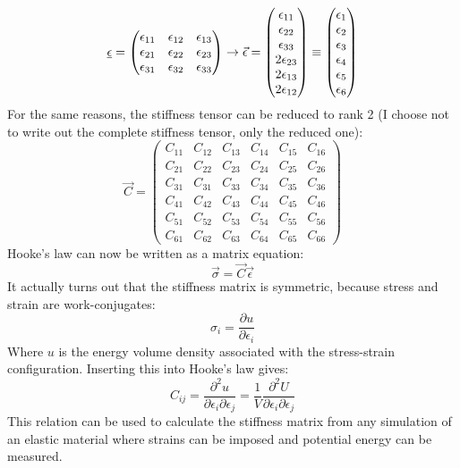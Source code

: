 \begin{equation}
	\uline{\epsilon} = 
	\begin{pmatrix}
	\epsilon_{11} & \epsilon_{12} & \epsilon_{13} \\
	\epsilon_{21} & \epsilon_{22} & \epsilon_{23} \\
	\epsilon_{31} & \epsilon_{32} & \epsilon_{33} \\ 
	\end{pmatrix}
	\to 
	\vec{\epsilon} = 
	\begin{pmatrix}
	\epsilon_{11} \\ \epsilon_{22} \\ \epsilon_{33} \\ 2\epsilon_{23} \\ 2\epsilon_{13} \\ 2\epsilon_{12}
	\end{pmatrix}
	\equiv
	\begin{pmatrix}
	\epsilon_{1} \\ \epsilon_{2} \\ \epsilon_{3} \\ \epsilon_{4} \\ \epsilon_{5} \\ \epsilon_{6}
	\end{pmatrix}
	\label{eq:epsilon_def}
\end{equation}
For the same reasons, the stiffness tensor can be reduced to rank 2 (I choose not to write out the complete stiffness tensor, only the reduced one):
\begin{equation}
	\vec{C} =
	\begin{pmatrix}
	C_{11} & C_{12} & C_{13} & C_{14} & C_{15} & C_{16} \\
	C_{21} & C_{22} & C_{23} & C_{24} & C_{25} & C_{26} \\
	C_{31} & C_{31} & C_{33} & C_{34} & C_{35} & C_{36} \\
	C_{41} & C_{42} & C_{43} & C_{44} & C_{45} & C_{46} \\
	C_{51} & C_{52} & C_{53} & C_{54} & C_{55} & C_{56} \\
	C_{61} & C_{62} & C_{63} & C_{64} & C_{65} & C_{66}
	\end{pmatrix}
\end{equation}
Hooke's law can now be written as a matrix equation:
\begin{equation}
	\vec{\sigma} = \vec{C}\vec{\epsilon}
\end{equation}
It actually turns out that the stiffness matrix is symmetric, because stress and strain are work-conjugates:
\begin{equation}
	\sigma_i = \frac{\partial u}{\partial \epsilon_i}
\end{equation}
Where $u$ is the energy volume density associated with the stress-strain configuration.
Inserting this into Hooke's law gives:
\begin{equation}
	C_{ij}=\frac{\partial^2 u}{\partial \epsilon_i \partial \epsilon_j} = \frac{1}{V} \frac{\partial^2 U}{\partial \epsilon_i \partial \epsilon_j} 
\end{equation}
This relation can be used to calculate the stiffness matrix from any simulation of an elastic material where strains can be imposed and potential energy can be measured.

